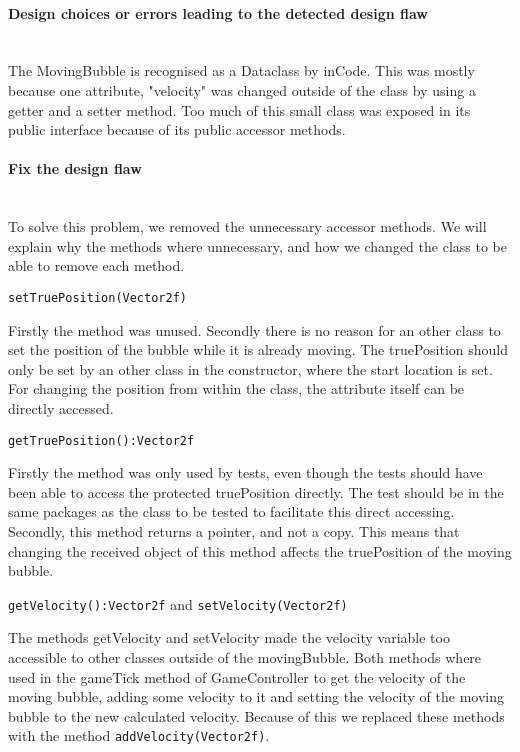 \documentclass[a4paper]{article}
\begin{document}
\paragraph{Design choices or errors leading to the detected design flaw}\mbox{}\\
The MovingBubble is recognised as a Dataclass by inCode. This was mostly because one attribute, "velocity" was changed outside of the class by using a getter and a setter method. Too much of this small class was exposed in its public interface because of its public accessor methods.

\paragraph{Fix the design flaw}\mbox{}\\
To solve this problem, we removed the unnecessary accessor methods. We will explain why the methods where unnecessary, and how we changed the class to be able to remove each method.

\texttt{setTruePosition(Vector2f)}

Firstly the method was unused. Secondly there is no reason for an other class to set the position of the bubble while it is already moving. The truePosition should only be set by an other class in the constructor, where the start location is set. For changing the position from within the class, the attribute itself can be directly accessed.

\texttt{getTruePosition():Vector2f}

Firstly the method was only used by tests, even though the tests should have been able to access the protected truePosition directly. The test should be in the same packages as the class to be tested to facilitate this direct accessing.
Secondly, this method returns a pointer, and not a copy. This means that changing the received object of this method affects the truePosition of the moving bubble.

\texttt{getVelocity():Vector2f} and \texttt{setVelocity(Vector2f)}

The methods getVelocity and setVelocity made the velocity variable too accessible to other classes outside of the movingBubble.
Both methods where used in the gameTick method of GameController to get the velocity of the moving bubble, adding some velocity to it and setting the velocity of the moving bubble to the new calculated velocity. Because of this we replaced these methods with the method \texttt{addVelocity(Vector2f)}.
\end{document}
